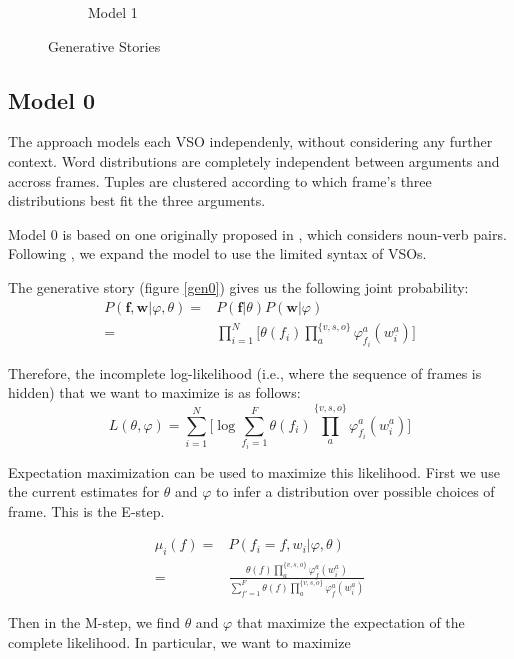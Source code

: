 \documentclass{article} %
\renewcommand\phi\varphi
\begin{document}
\begin{figure}[h]
\begin{subfigure}[b]{0.45\textwidth}
    

    \caption{Model 1}
    \label{gen1}

  \end{subfigure}

  \caption{Generative Stories}

\end{figure}



\subsection{Model 0}

The approach models each VSO independenly, without considering any further context.
Word distributions are completely independent between arguments and accross frames.
Tuples are clustered according to which frame's three distributions best fit the 
three arguments.

Model 0 is based on one originally proposed in \citet{rooth1999}, which 
considers noun-verb pairs. Following \citet{oconnor2013}, we expand the model
to use the limited syntax of VSOs.

The generative story (figure \ref{gen0}) gives us the following joint probability:
\begin{align*}
P(\mathbf{f},\mathbf{w}|\phi,\theta) 
  =& P(\mathbf{f}|\theta)P(\mathbf{w}|\phi)\\
  =& \prod_{i=1}^{N}\big[\theta(f_i) \prod_a^{\{v,s,o\}}\phi_{f_i}^a(w_i^a)\big]
\end{align*}

Therefore, the incomplete log-likelihood (i.e., where the sequence of frames
is hidden) that we want to maximize is as follows:
\[
L(\theta,\phi) = \sum_{i=1}^N\big[\log \sum_{f_i=1}^F\theta(f_i)\prod_{a}^{\{v,s,o\}}\phi_{f_i}^a(w^a_i)\big]
\]

Expectation maximization can be used to maximize this likelihood.
First we use the current estimates for $\theta$ and $\phi$ to infer a 
distribution over possible choices of frame. This is the E-step. 

\begin{align}
\mu_i(f) =& P(f_i=f, w_i|\phi,\theta)\nonumber\\
=& \frac{\theta(f)\prod_a^{\{v,s,o\}}\phi_f^a(w^a_i)}
                {\sum_{f'=1}^F\theta(f)\prod_a^{\{v,s,o\}}\phi_f^a(w^a_i)}\label{E}
\end{align}

Then in the M-step, we find $\theta$ and $\phi$ that maximize the expectation of
the complete likelihood. In particular, we want to maximize
\end{document}
